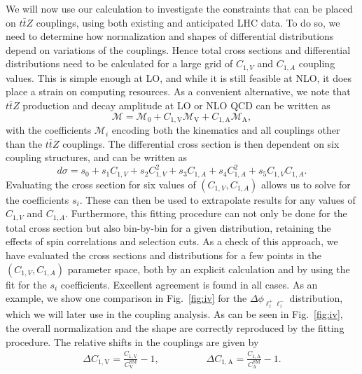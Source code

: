 \documentclass{JHEP3}
\newcommand{\mrm}{\mathrm}
\def\ttbZ{t\bar{t}Z}
\def\ConeA{C_{1,\mathrm{A}}}
\def\ConeV{C_{1,\mathrm{V}}}
\def\ConeVSM{C_\mathrm{V}^{\mrm{SM}}}
\def\ConeASM{C_\mathrm{A}^{\mrm{SM}}}
\def\DConeA{\Delta C_{1,\mathrm{A}}}
\def\DConeV{\Delta C_{1,\mathrm{V}}}
\newcommand{\be}{\begin{eqnarray}}
\newcommand{\ee}{\end{eqnarray}}
\begin{document}
We will now use our calculation to investigate the constraints that can be placed on $\ttbZ$ couplings, 
using both existing and anticipated LHC data. 
To do so, we need to determine how normalization and shapes of differential distributions depend on variations of the couplings. 
Hence total cross sections and differential distributions need to be calculated for a large grid of $C_{1,V}$ and $C_{1,A}$ coupling values. 
This is simple enough at LO, and while it is still feasible at NLO, it does place a strain on computing resources. 
As a convenient alternative, we note that $\ttbZ$ production and decay amplitude at LO or NLO QCD can be written as
\begin{equation}
    \mathcal{M} = \mathcal{M}_0 +  \ConeV \mathcal{M}_\mathrm{V} +  \ConeA \mathcal{M}_\mathrm{A},
\end{equation}
with the coefficients $\mathcal{M}_i$ encoding both the kinematics and all couplings other than the $\ttbZ$ couplings. 
The differential cross section is then dependent on six coupling structures, and can be written as
\begin{equation}
    \label{couplfit}
    d\sigma = s_0 +s_1C_{1,V} + s_2C_{1,V}^2 +s_3 C_{1,A}+s_4C_{1,A}^2+s_5C_{1,V}C_{1,A}.
\end{equation}
Evaluating the cross section for six values of $(C_{1,V},C_{1,A})$ allows us to solve for the coefficients $s_i$. 
These can then be used to extrapolate results for any values of $C_{1,V}$ and $C_{1,A}$. 
Furthermore, this fitting procedure can not only be done for the total cross section but also bin-by-bin for a given distribution, 
retaining the effects of spin correlations and selection cuts.
As a check of this approach, we have evaluated the cross sections and distributions for a few points in the $(C_{1,V},C_{1,A})$ parameter space, 
both by an explicit calculation and by using the fit for the $s_i$ coefficients. Excellent agreement is found in all cases. 
As an example, we show one comparison in Fig.~\ref{fig:iv} for the  $\Delta \phi_{\ell^+_z \ell^-_z}$ distribution, which we will later use in the coupling analysis.
As can be seen in Fig.~\ref{fig:iv}, the overall normalization and the shape are correctly reproduced by the fitting procedure.
The relative shifts in the couplings are given by
\be
  \DConeV =  \frac{\ConeV}{\ConeVSM}-1,
  \hspace{2cm} 
  \DConeA = \frac{\ConeA}{\ConeASM}-1.
\ee
\end{document}
